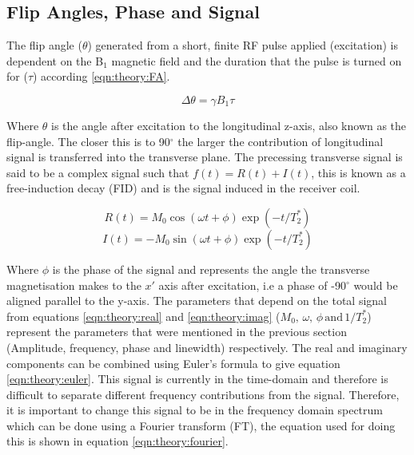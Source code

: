 \documentclass[class=article, crop=false]{standalone}
\begin{document}
\subsection{Flip Angles, Phase and Signal}

The flip angle ($\theta$) generated from a short, finite RF pulse applied (excitation) is dependent on the B$_1$ magnetic field and the duration that the pulse is turned on for ($\tau$) according \ref{eqn:theory:FA}.

\begin{equation}
    \Delta\theta = \gamma B_1 \tau
    \label{eqn:theory:FA}
\end{equation}

Where $\theta$ is the angle after excitation to the longitudinal z-axis, also known as the flip-angle. The closer this is to 90$^\circ$ the larger the contribution of longitudinal signal is transferred into the transverse plane. The precessing transverse signal is said to be a complex signal such that $f(t) = R(t) + I(t)$, this is known as a free-induction decay (FID) and is the signal induced in the receiver coil.

\begin{equation}
    R(t) = M_0\cos(\omega t+ \phi)\exp(-t/T_2^*)
    \label{eqn:theory:real}
\end{equation}
\begin{equation}
    I(t) = -M_0\sin(\omega t+ \phi)\exp(-t/T_2^*)
    \label{eqn:theory:imag}
\end{equation}

Where $\phi$ is the phase of the signal and represents the angle the transverse magnetisation makes to the $x'$ axis after excitation, i.e a phase of -90$^\circ$ would be aligned parallel to the y-axis. The parameters that depend on the total signal from equations \ref{eqn:theory:real} and \ref{eqn:theory:imag} ($M_0, \, \omega, \, \phi \, \textrm{and} \, 1/T_2^*$) represent the parameters that were mentioned in the previous section (Amplitude, frequency, phase and linewidth) respectively. The real and imaginary components can be combined using Euler's formula to give equation \ref{eqn:theory:euler}. This signal is currently in the time-domain and therefore is difficult to separate different frequency contributions from the signal. Therefore, it is important to change this signal to be in the frequency domain spectrum which can be done using a Fourier transform\cite{Fourier1822TheorieChaleur} (FT), the equation used for doing this is shown in equation \ref{eqn:theory:fourier}.
\end{document}
